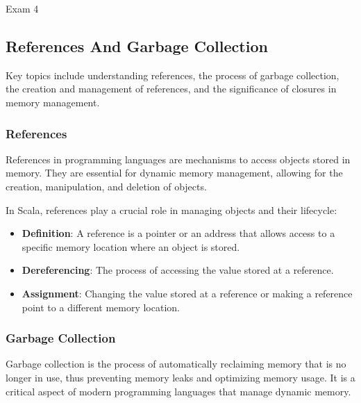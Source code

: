 \begin{examnotes}{Exam 4}
    \subsection*{References And Garbage Collection}

    Key topics include understanding references, the process of garbage collection, the creation and management of references, and the significance of closures in memory management.
    
    \subsubsection*{References}
    
    References in programming languages are mechanisms to access objects stored in memory. They are essential for dynamic memory management, allowing for the creation, manipulation, and deletion of objects.
    
    \begin{highlight}
        In Scala, references play a crucial role in managing objects and their lifecycle:
        \begin{itemize}
            \item \textbf{Definition}: A reference is a pointer or an address that allows access to a specific memory location where an object is stored.
            \item \textbf{Dereferencing}: The process of accessing the value stored at a reference.
            \item \textbf{Assignment}: Changing the value stored at a reference or making a reference point to a different memory location.
        \end{itemize}
    \end{highlight}
    
    \subsubsection*{Garbage Collection}
    
    Garbage collection is the process of automatically reclaiming memory that is no longer in use, thus preventing memory leaks and optimizing memory usage. It is a critical aspect of modern programming languages that manage dynamic memory.
    

\end{examnotes}
